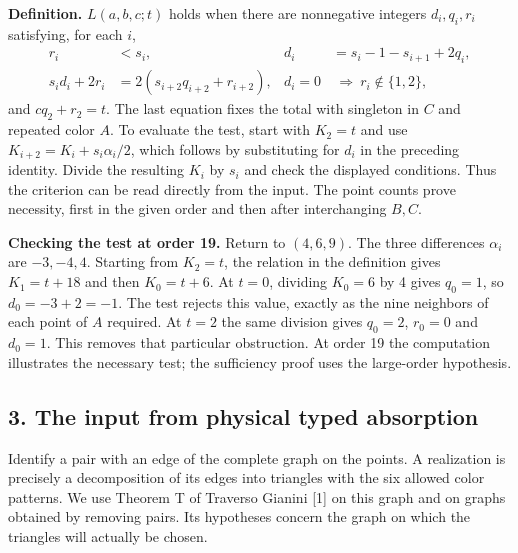 \documentclass[english,11pt,a4paper]{article}
\begin{document}
\textbf{Definition.} \(L(a,b,c;t)\) holds when there are nonnegative integers \(d_i,q_i,r_i\) satisfying, for each \(i\), \[\begin{aligned}
 r_i&<s_i, & d_i&=s_i-1-s_{i+1}+2q_i,\\
 s_id_i+2r_i&=2(s_{i+2}q_{i+2}+r_{i+2}),&
 d_i=0&\ \Longrightarrow\ r_i\notin\{1,2\},
\end{aligned}\] and \(cq_2+r_2=t\). The last equation fixes the total with singleton in \(C\) and repeated color \(A\). To evaluate the test, start with \(K_2=t\) and use \(K_{i+2}=K_i+s_i\alpha_i/2\), which follows by substituting for \(d_i\) in the preceding identity. Divide the resulting \(K_i\) by \(s_i\) and check the displayed conditions. Thus the criterion can be read directly from the input. The point counts prove necessity, first in the given order and then after interchanging \(B,C\).

\textbf{Checking the test at order 19.} Return to \((4,6,9)\). The three differences \(\alpha_i\) are \(-3,-4,4\). Starting from \(K_2=t\), the relation in the definition gives \(K_1=t+18\) and then \(K_0=t+6\). At \(t=0\), dividing \(K_0=6\) by 4 gives \(q_0=1\), so \(d_0=-3+2=-1\). The test rejects this value, exactly as the nine neighbors of each point of \(A\) required. At \(t=2\) the same division gives \(q_0=2\), \(r_0=0\) and \(d_0=1\). This removes that particular obstruction. At order 19 the computation illustrates the necessary test; the sufficiency proof uses the large-order hypothesis.

\subsection{3. The input from physical typed absorption}\label{the-input-from-physical-typed-absorption}

Identify a pair with an edge of the complete graph on the points. A realization is precisely a decomposition of its edges into triangles with the six allowed color patterns. We use Theorem T of Traverso Gianini {[}1{]} on this graph and on graphs obtained by removing pairs. Its hypotheses concern the graph on which the triangles will actually be chosen.
\end{document}
